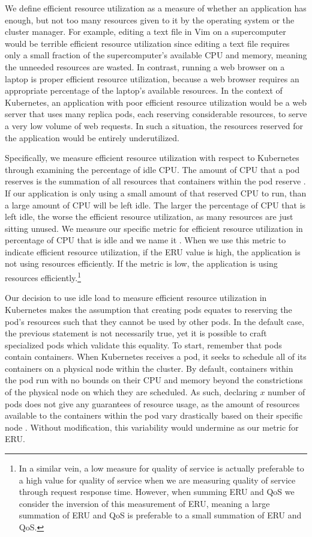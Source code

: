 We define efficient resource utilization as a measure of whether an application
has enough, but not too many resources given to it by the operating system or
the cluster manager. For example, editing a text file in Vim on a supercomputer
would be terrible efficient resource utilization since editing a text file
requires only a small fraction of the supercomputer's available CPU and memory,
meaning the unneeded resources are wasted. In contrast, running a web browser on
a laptop is proper efficient resource utilization, because a web browser requires
an appropriate percentage of the laptop's available resources.
In the context of Kubernetes, an application with
poor efficient resource utilization would be a web server
that uses many replica pods, each reserving considerable resources,
to serve a very low volume of web requests. In such a situation, the resources
reserved for the application would be entirely underutilized.

Specifically, we measure efficient resource utilization with respect to
Kubernetes through examining the percentage of idle CPU.
The amount of CPU that a pod reserves is the summation of
all resources that containers within the pod reserve
\cite{k8s-compute-resources}. If our application is only using a small amount of
that reserved CPU to run, than a large amount of CPU will be left idle. The
larger the percentage of CPU that is left idle, the worse the efficient resource
utilization, as many resources are just sitting unused.
We measure our specific metric for efficient resource
utilization in percentage of CPU that is idle and we name it
. When we use this metric to indicate efficient resource utilization,
if the ERU value is high, the application is not using resources efficiently. If
the metric is low, the application is using resources efficiently.\footnote{In a
similar vein, a low measure for quality of service is actually preferable to a
high value for quality of service when we are measuring quality of service
through request response time. However, when summing ERU and QoS we consider
the inversion of this measurement of ERU, meaning a large summation of ERU and
QoS is preferable to a small summation of ERU and QoS.}

Our decision to use idle load to measure efficient resource utilization
in Kubernetes makes the assumption that
creating pods equates to reserving the pod's resources such
that they cannot be used by other pods.
In the default case, the previous statement is not necessarily true,
yet it is possible to craft specialized pods which validate this equality. To
start, remember that pods contain containers. When Kubernetes receives a pod, it
seeks to schedule all of its containers on a physical node within the cluster.
By default, containers within the pod run with no bounds on their CPU and memory
beyond the constrictions of the physical node on which they are scheduled. As such,
declaring $x$ number of pods does not give any guarantees of resource usage, as
the amount of resources available to the containers within the pod vary
drastically based on their specific node \cite{k8s-limit-range}. Without
modification, this variability would undermine  as our metric for
ERU.

